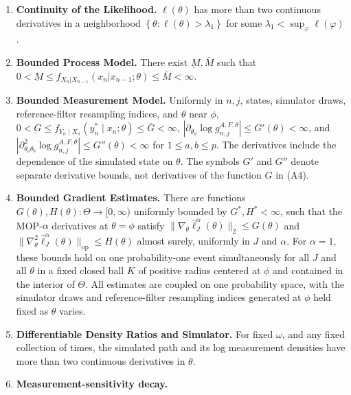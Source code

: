 \documentclass[numsec,webpdf,modern,medium,namedate]{oup-authoring-template}
\newcommand\arxiv[2]{#1}
\begin{document}
\arxiv{}{\vspace*{-3ex}}
\begin{enumerate}[label=(A\arabic*),itemsep=0pt] 
    \item \textbf{Continuity of the Likelihood.} $\ell(\theta)$ has more than two continuous derivatives in a neighborhood $\left\{\theta: \ell(\theta)>\lambda_1\right\}$ for some $\lambda_1<\sup _{\varphi} \ell(\varphi)$.\label{assump:conti-lik}
    \item \textbf{Bounded Process Model.} There exist $\underbar{M}, \bar{M}$ such that $0 < \underbar{M} \leq f_{X_n|X_{n-1}}(x_n | x_{n-1};\theta) \leq \bar{M} < \infty$.\label{assump:bounded-process}
    \item \textbf{Bounded Measurement Model.} Uniformly in $n,j$, states, simulator draws, reference-filter resampling indices, and $\theta$ near $\phi$,
    $0<\underbar G\leq f_{Y_n\mid X_n}(y_n^*\mid x_n;\theta)\leq\bar G<\infty$,
    $|\partial_{\theta_a}\log g_{n,j}^{A,F,\theta}|\leq G'(\theta)<\infty$, and
    $|\partial_{\theta_a\theta_b}^2\log g_{n,j}^{A,F,\theta}|\leq G''(\theta)<\infty$
    for $1\leq a,b\leq p$. The derivatives include the dependence of the simulated state on $\theta$.
    The symbols $G'$ and $G''$ denote separate derivative bounds,
    not derivatives of the function $G$ in (A4).\label{assump:bounded-measurement}
    \item \textbf{Bounded Gradient Estimates.} There are functions $G(\theta), H(\theta): \Theta \to [0,\infty)$ uniformly bounded by $G^*, H^*<\infty$, such that the MOP-$\alpha$ derivatives at $\theta=\phi$ satisfy $\|\nabla_\theta\hat\ell_J^\alpha(\theta)\|_2\leq G(\theta)$ and $\|\nabla_\theta^2\hat\ell_J^\alpha(\theta)\|_{\mathrm{op}}\leq H(\theta)$ almost surely, uniformly in $J$ and $\alpha$. For $\alpha=1$, these bounds hold on one probability-one event simultaneously for all $J$ and all $\theta$ in a fixed closed ball $K$ of positive radius centered at $\phi$ and contained in the interior of $\Theta$. All estimates are coupled on one probability space, with the simulator draws and reference-filter resampling indices generated at $\phi$ held fixed as $\theta$ varies.\label{assump:local-bounded-derivative}
    \item \textbf{Differentiable Density Ratios and Simulator.} For fixed $\omega$, and any fixed collection of times, the simulated path and its log measurement densities have more than two continuous derivatives in $\theta$.\label{assump:diff-meas-and-sim}
\item{\textbf{Measurement-sensitivity decay.}}

\end{enumerate}
\end{document}
